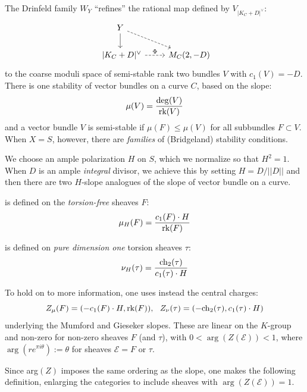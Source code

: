 \documentclass{amsart}
\begin{document}
The Drinfeld family $W_Y$  ``refines''  the rational map defined by $V_{|K_C + D|^\vee}$: 
\[ \begin{tikzcd}
    Y \arrow[dr, dashed] \arrow[d] \\
    \ | K_C + D|^\vee \arrow[r, dashed, "\Phi"] & M_C(2, -D)
\end{tikzcd} \]
to the coarse moduli space of semi-stable rank two bundles $V$ with $c_1(V) = -D$. There is one stability of 
vector bundles on a curve $C$, based on the slope: 
\[ \mu(V) = \frac{\deg(V)}{\mbox{rk}(V)} \] 
and a vector bundle $V$ is semi-stable if
$\mu(F) \le \mu(V)$ for all subbundles $F \subset V$.
When $X = S$, however, there are {\it families} of (Bridgeland) stability conditions. 

\medskip

We choose an ample polarization $H$ on $S$, which we normalize so that $H^2 = 1$.  When 
$D$ is an ample {\it integral} divisor, we achieve this by setting
$H = D/||D||$ and 
then there are two $H$-slope analogues of the slope of vector bundle on a curve. 

\medskip

 is defined on the {\it torsion-free} sheaves $F$:
\[ \mu_H(F) = \frac{c_1(F) \cdot H}{\mbox{rk}(F)} \] 

 is defined on {\it pure dimension one} torsion sheaves $\tau$:
\[ \nu_H(\tau) = \frac{\mbox{ch}_2(\tau)}{c_1(\tau) \cdot H} \] 

To hold on to more information, one uses instead the central charges: 
\[ Z_{\mu}(F) = (-c_1(F) \cdot H, \rk(F)), \ \ Z_\nu(\tau) = ( -\ch_2(\tau), c_1(\tau) \cdot H)    \] 
underlying the Mumford and Gieseker slopes. 
These are linear on the $K$-group  and non-zero for non-zero sheaves $F$ (and $\tau$), with
$0 < \arg(Z({\mathcal E})) < 1$,  where $\arg(re^{\pi i \theta}) := \theta$  
for sheaves ${\mathcal E} = F$ or $\tau$.  

\medskip

Since arg$(Z)$ imposes the same ordering as the slope, one makes the following
definition, enlarging the categories to include sheaves with $\arg(Z({\mathcal E})) = 1$. 

\medskip
\end{document}
